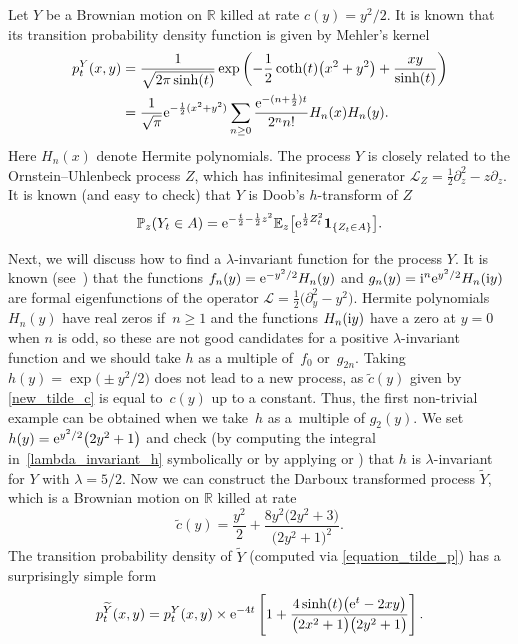 \documentclass[pdftex]{sigma}
\numberwithin{equation}{section}
\theoremstyle{definition}
\def\L{{\mathcal L}}
\def\p{{\mathbb P}}
\def\e{{\mathbb E}}
\def\r{{\mathbb R}}
\def\i{{\textnormal i}}
\begin{document}
Let $Y$ be a Brownian motion on $\r$ killed at rate $c(y)=y^2/2$. It is known that its transition probability density function is given by
Mehler's kernel
\begin{align*}
p^Y_t(x,y)&=\frac{1}{\sqrt{2\pi \sinh(t)}}
\exp\left(- \frac{1}{2}\coth(t) \bigl(x^2+y^2\bigr) + \frac{xy}{\sinh(t)} \right)\\
&=
\frac{1}{\sqrt{\pi}} {\rm e}^{-\frac{1}{2} (x^2+y^2 )}\sum\limits_{n\ge 0} \frac{{\rm e}^{- (n+\frac{1}{2}) t}}{2^n n!} H_n(x) H_n(y).
\end{align*}
Here $H_n(x)$ denote Hermite polynomials.
The process $Y$ is closely related to the Ornstein--Uhlenbeck process $Z$, which has infinitesimal generator $\L_Z=\frac{1}{2} \partial_z^2 - z \partial_z$.
It is known (and easy to check) that $Y$ is Doob's $h$-transform of $Z$
\[
\p_z(Y_t \in A)={\rm e}^{-\frac{t}{2}-\frac{1}{2} z^2} \e_z\big[ {\rm e}^{\frac{1}{2} Z_t^2} {\mathbf 1}_{\{Z_t \in A\}}\big].
\]

Next, we will discuss how to find a $\lambda$-invariant function for the process $Y$. It is known (see~\cite[Example 2.3]{Gomez_2020}) that the functions $f_n(y)={\rm e}^{-y^2/2}H_n(y)$ and $ g_n(y)=\i^n {\rm e}^{y^2/2} H_n(\i y)$ are formal eigenfunctions of the operator $\L=\frac{1}{2} \bigl(\partial_y^2 - y^2\bigr)$. Hermite polynomials $H_n(y)$ have real zeros if~$n\ge 1$ and the functions $H_n(\i y)$ have a zero at $y=0$ when $n$ is odd, so these are not good candidates for
a positive $\lambda$-invariant function and we should take $h$ as a multiple of~$f_0$ or~$g_{2n}$. Taking $h(y)=\exp\bigl(\pm y^2/2\bigr)$ does not lead to a new process, as $\tilde c(y)$ given by \eqref{new_tilde_c} is equal to~$c(y)$ up to a constant. Thus, the first non-trivial example can be obtained when we take~$h$ as a~multiple of $g_2(y)$. We set $h(y)={\rm e}^{y^2/2} \bigl(2y^2+1\bigr)$ and check (by computing the integral in~\eqref{lambda_invariant_h} symbolically
or by applying \cite[Theorem 2.7]{Rogers_2021} or \cite[Corollary 2.2]{Mijatovic_2012}) that $h$ is $\lambda$-invariant for $Y$ with $\lambda=5/2$. Now we can construct the Darboux transformed process $\widetilde Y$, which is
 a Brownian motion on $\r$ killed at rate
\[
\tilde c(y)=\frac{y^2}{2}+\frac{8 y^2 \bigl(2y^2 + 3\bigr)}{\bigl(2y^2+1\bigr)^2}.
\]
The transition probability density of $\widetilde Y$ (computed via \eqref{equation_tilde_p}) has a surprisingly simple form
\begin{equation}\label{eq:tilde_p_OU}
p^{\widetilde Y}_t(x,y)
=p^Y_t(x,y) \times {\rm e}^{-4t}
\left[ 1 + \frac{4 \sinh(t) \bigl({\rm e}^{t}-2xy\bigr)}{\bigl(2x^2+1\bigr)\bigl(2y^2+1\bigr)}\right].
\end{equation}
\end{document}

